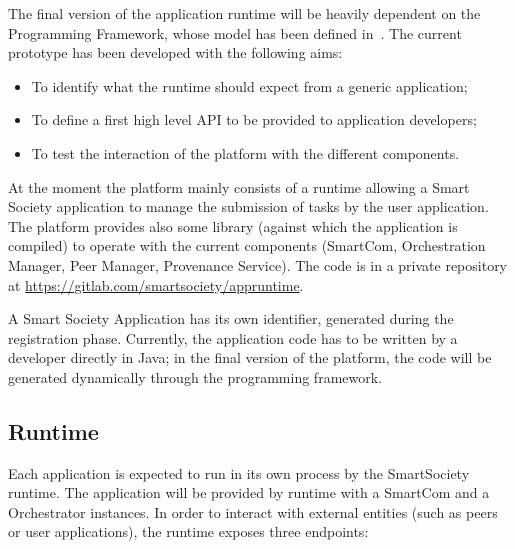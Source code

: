 The final version of the application runtime will be heavily dependent on the Programming Framework, whose model has been defined in~\cite{D7.2}. The current prototype has been developed with the following aims: 
\begin{itemize}
	\item To identify what the runtime should expect from a generic application;
    \item To define a first high level API to be provided to application developers;
	\item To test the interaction of the platform with the different components.
\end{itemize}

At the moment the platform mainly consists of a runtime allowing a Smart Society application to manage the submission of tasks by the user application. The platform provides also some library (against which the application is compiled) to operate with the current components (SmartCom, Orchestration Manager, Peer Manager, Provenance Service). The code is in a private repository at \url{https://gitlab.com/smartsociety/appruntime}.

A Smart Society Application has its own identifier, generated during the registration phase. Currently, the application code has to be written by a developer directly in Java; in the final version of the platform, the code will be generated dynamically through the programming framework. %

\subsection{Runtime}
Each application is expected to run in its own process by the SmartSociety runtime. The application will be provided by runtime with a SmartCom and a Orchestrator instances. In order to interact with external entities (such as peers or user applications), the runtime exposes three endpoints:

